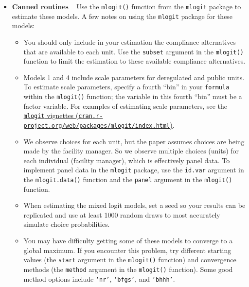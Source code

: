 \documentclass[11pt,letterpaper]{article}
\begin{document}
\begin{itemize}[label={}, leftmargin=*]
	\item \textbf{Canned routines} ~ Use the \texttt{mlogit()} function from the \texttt{mlogit} package to estimate these models. A few notes on using the \texttt{mlogit} package for these models:
	\begin{itemize}
		\item You should only include in your estimation the compliance alternatives that are available to each unit. Use the \texttt{subset} argument in the \texttt{mlogit()} function to limit the estimation to these available compliance alternatives.
		\item Models 1 and 4 include scale parameters for deregulated and public units. To estimate scale parameters, specify a fourth ``bin'' in your \texttt{formula} within the \texttt{mlogit()} function; the variable in this fourth ``bin'' must be a factor variable. For examples of estimating scale parameters, see the \href{https://cran.r-project.org/web/packages/mlogit/index.html}{\texttt{mlogit} vignettes (\texttt{cran.r-project.org/web/packages/mlogit/index.html})}.
		\item We observe choices for each unit, but the paper assumes choices are being made by the facility manager. So we observe multiple choices (units) for each individual (facility manager), which is effectively panel data. To implement panel data in the \texttt{mlogit} package, use the \texttt{id.var} argument in the \texttt{mlogit.data()} function and the \texttt{panel} argument in the \texttt{mlogit()} function.
		\item When estimating the mixed logit models, set a seed so your results can be replicated and use at least 1000 random draws to most accurately simulate choice probabilities.
		\item You may have difficulty getting some of these models to converge to a global maximum. If you encounter this problem, try different starting values (the \texttt{start} argument in the \texttt{mlogit()} function) and convergence methods (the \texttt{method} argument in the \texttt{mlogit()} function). Some good method options include \texttt{`nr'}, \texttt{`bfgs'}, and \texttt{`bhhh'}.
	\end{itemize}


\end{itemize}
\end{document}
